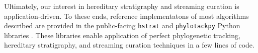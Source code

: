 Ultimately, our interest in hereditary stratigraphy and streaming curation is application-driven.
To these ends, reference implementatons of most algorithms described are provided in the public-facing \texttt{hstrat} and \texttt{phylotackpy} Python libraries \citep{moreno2022hstrat, dolson2023phylotrackpy}.
These libraries enable application of perfect phylogenetic tracking, hereditary stratigraphy, and streaming curation techniques in a few lines of code.
